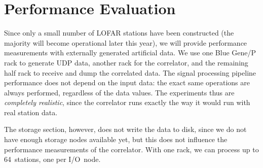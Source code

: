 \documentclass{sig-alternate}
\begin{document}



%



\section{Performance Evaluation}
\label{sec:performance}

Since only a small number of LOFAR stations have been constructed (the
majority will become operational later this year), we will provide
performance measurements with externally generated artificial data.
We use one Blue Gene/P rack to generate UDP data, another rack for the
correlator, and the remaining half rack to receive and dump the
correlated data.  The signal processing pipeline performance does not
depend on the input data: the exact same operations are always
performed, regardless of the data values.  The experiments thus are
\emph{completely realistic}, since the correlator runs exactly the way it
would run with real station data.

The storage section, however, does not write the data to disk, since we do
not have enough storage nodes available yet, but this does not influence the
performance measurements of the correlator.
With one rack, we can process up to 64~stations, one per I/O~node.
\end{document}
